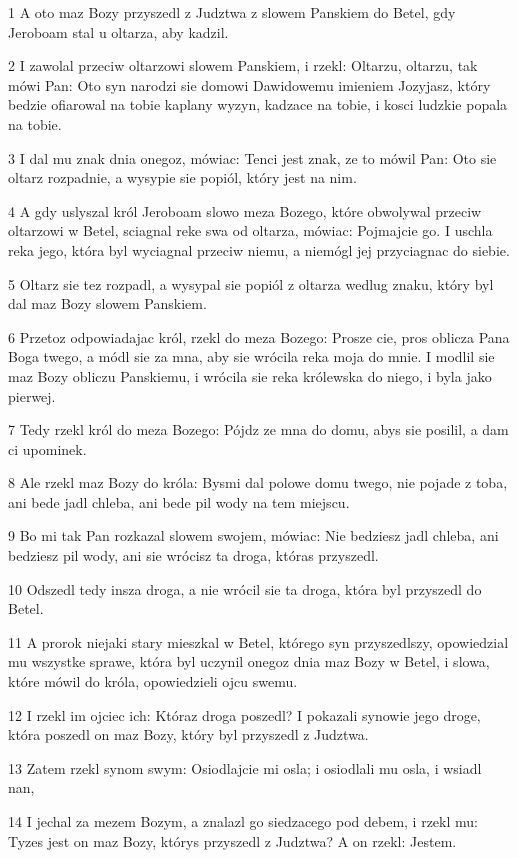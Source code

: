 \par 1 A oto maz Bozy przyszedl z Judztwa z slowem Panskiem do Betel, gdy Jeroboam stal u oltarza, aby kadzil.
\par 2 I zawolal przeciw oltarzowi slowem Panskiem, i rzekl: Oltarzu, oltarzu, tak mówi Pan: Oto syn narodzi sie domowi Dawidowemu imieniem Jozyjasz, który bedzie ofiarowal na tobie kaplany wyzyn, kadzace na tobie, i kosci ludzkie popala na tobie.
\par 3 I dal mu znak dnia onegoz, mówiac: Tenci jest znak, ze to mówil Pan: Oto sie oltarz rozpadnie, a wysypie sie popiól, który jest na nim.
\par 4 A gdy uslyszal król Jeroboam slowo meza Bozego, które obwolywal przeciw oltarzowi w Betel, sciagnal reke swa od oltarza, mówiac: Pojmajcie go. I uschla reka jego, która byl wyciagnal przeciw niemu, a niemógl jej przyciagnac do siebie.
\par 5 Oltarz sie tez rozpadl, a wysypal sie popiól z oltarza wedlug znaku, który byl dal maz Bozy slowem Panskiem.
\par 6 Przetoz odpowiadajac król, rzekl do meza Bozego: Prosze cie, pros oblicza Pana Boga twego, a módl sie za mna, aby sie wrócila reka moja do mnie. I modlil sie maz Bozy obliczu Panskiemu, i wrócila sie reka królewska do niego, i byla jako pierwej.
\par 7 Tedy rzekl król do meza Bozego: Pójdz ze mna do domu, abys sie posilil, a dam ci upominek.
\par 8 Ale rzekl maz Bozy do króla: Bysmi dal polowe domu twego, nie pojade z toba, ani bede jadl chleba, ani bede pil wody na tem miejscu.
\par 9 Bo mi tak Pan rozkazal slowem swojem, mówiac: Nie bedziesz jadl chleba, ani bedziesz pil wody, ani sie wrócisz ta droga, któras przyszedl.
\par 10 Odszedl tedy insza droga, a nie wrócil sie ta droga, która byl przyszedl do Betel.
\par 11 A prorok niejaki stary mieszkal w Betel, którego syn przyszedlszy, opowiedzial mu wszystke sprawe, która byl uczynil onegoz dnia maz Bozy w Betel, i slowa, które mówil do króla, opowiedzieli ojcu swemu.
\par 12 I rzekl im ojciec ich: Któraz droga poszedl? I pokazali synowie jego droge, która poszedl on maz Bozy, który byl przyszedl z Judztwa.
\par 13 Zatem rzekl synom swym: Osiodlajcie mi osla; i osiodlali mu osla, i wsiadl nan,
\par 14 I jechal za mezem Bozym, a znalazl go siedzacego pod debem, i rzekl mu: Tyzes jest on maz Bozy, którys przyszedl z Judztwa? A on rzekl: Jestem.
